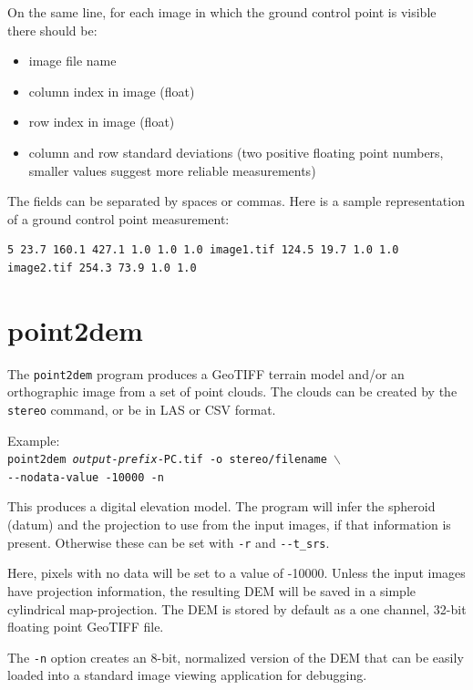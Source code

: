 On the same line, for each image in which the ground control point is
visible there should be:

\begin{itemize}
\item image file name
\item column index in image (float)
\item row index in image (float)
\item column and row standard deviations (two positive floating point
  numbers, smaller values suggest more reliable measurements)
\end{itemize}

The fields can be separated by spaces or commas. Here is a sample representation
of a ground control point measurement:

\begin{verbatim}
5 23.7 160.1 427.1 1.0 1.0 1.0 image1.tif 124.5 19.7 1.0 1.0 image2.tif 254.3 73.9 1.0 1.0
\end{verbatim}

\section{point2dem}
\label{point2dem}

The \texttt{point2dem} program produces a GeoTIFF terrain model and/or
an orthographic image from a set of point clouds. The clouds can be
created by the {\tt stereo} command, or be in LAS or CSV format.

Example:\\
\hspace*{2em}\texttt{point2dem \textit{output-prefix}-PC.tif -o stereo/filename $\backslash$} \\
\hspace*{4em}\texttt{-\/-nodata-value -10000 -n}

This produces a digital elevation model. The program will infer the
spheroid (datum) and the projection to use from the input images, if that
information is present. Otherwise these can be set with \texttt{-r} and \texttt{-\/-t\_srs}.

Here, pixels with no data will be set to a value of -10000. Unless the input
images have projection information, the resulting \ac{DEM} will be saved
in a simple cylindrical map-projection.  The \ac{DEM} is
stored by default as a one channel, 32-bit floating point GeoTIFF file.

The {\tt -n} option creates an 8-bit, normalized version of the DEM
that can be easily loaded into a standard image viewing application
for debugging.

